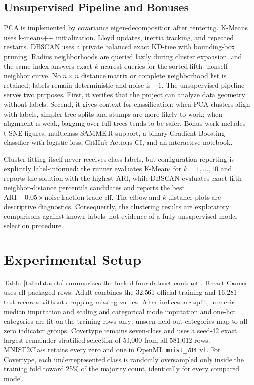 \documentclass[conference]{IEEEtran}
\begin{document}
\subsection{Unsupervised Pipeline and Bonuses}
PCA is implemented by covariance eigen-decomposition after centering. K-Means
uses k-means++ initialization, Lloyd updates, inertia tracking, and repeated
restarts. DBSCAN uses a private balanced exact KD-tree with bounding-box
pruning. Radius neighborhoods are queried lazily during cluster expansion,
and the same index answers exact $k$-nearest queries for the sorted fifth-
nonself-neighbor curve. No $n\times n$ distance matrix or complete
neighborhood list is retained; labels remain deterministic and noise is $-1$.
The unsupervised pipeline serves two purposes. First, it verifies that the
project can analyze data geometry without labels. Second, it gives context
for classification: when PCA clusters align with labels, simpler tree splits
and stumps are more likely to work; when alignment is weak, bagging over full
trees tends to be safer. Bonus work includes t-SNE figures, multiclass
SAMME.R support, a binary Gradient Boosting classifier with logistic loss,
GitHub Actions CI, and an interactive notebook.

Cluster fitting itself never receives class labels, but configuration reporting
is explicitly label-informed: the runner evaluates K-Means for $k=1,\ldots,10$
and reports the solution with the highest ARI, while DBSCAN evaluates exact
fifth-neighbor-distance percentile candidates and reports the best
$\mathrm{ARI}-0.05\times\mathrm{noise\ fraction}$ trade-off. The elbow and
$k$-distance plots are descriptive diagnostics. Consequently, the clustering
results are exploratory comparisons against known labels, not evidence of a
fully unsupervised model-selection procedure.

\section{Experimental Setup}
Table~\ref{tab:datasets} summarizes the locked four-dataset contract
\cite{uciAdult,uciCovertype,openmlMnist}. Breast
Cancer uses all packaged rows. Adult combines the 32,561 official training
and 16,281 test records without dropping missing values. After indices are
split, numeric median imputation and scaling and categorical mode imputation
and one-hot categories are fit on the training rows only; unseen held-out
categories map to all-zero indicator groups. Covertype remains seven-class
and uses a seed-42 exact largest-remainder stratified selection of 50,000 from
all 581,012 rows. MNIST2Class retains every zero and one in OpenML
\texttt{mnist\_784} v1. For Covertype, each underrepresented class is randomly
oversampled only inside the training fold toward 25\% of the majority count,
identically for every compared model.
\end{document}

